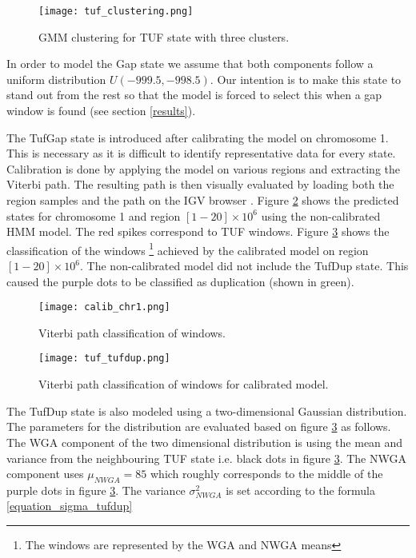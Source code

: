 \documentclass[12pt]{article}
\begin{document}
\begin{figure}[!htb]
	\begin{center}
		\texttt{[image: tuf\_clustering.png]}
	\end{center}
	\caption{GMM clustering for TUF state with three clusters.}
	\label{tuf_clustering}
\end{figure}

In order to model the Gap state we assume that both components follow a uniform distribution $U(-999.5, -998.5)$. Our intention is to make this state to stand out from the rest so that the model is forced to  select this when a gap window is found (see section \ref{results}).
 
The TufGap state is introduced after calibrating the model on chromosome 1.   
This is necessary as it is difficult to identify representative data for every state. Calibration is done by applying  the model on various regions and extracting the Viterbi path. The resulting path is then visually evaluated by loading both the region samples and the path on the IGV browser \cite{2011Robinson}.  Figure \ref{calib_chr1} shows the predicted states for chromosome 1 and region $[1-20]\times 10^6$ using the non-calibrated HMM model. The red spikes correspond to TUF windows. Figure \ref{tuf_tufdup} shows the classification of the windows \footnote{The windows are represented by the WGA and NWGA means} achieved by the calibrated model on region $[1-20]\times 10^6$. The non-calibrated model did not include the TufDup state. This caused the purple dots to be classified as duplication (shown in green). 

\begin{figure}[!htb]
	\begin{center}
		\texttt{[image: calib\_chr1.png]}
	\end{center}
	\caption{Viterbi path classification of windows.}
	\label{calib_chr1}
\end{figure}

\begin{figure}[!htb]
	\begin{center}
		\texttt{[image: tuf\_tufdup.png]}
	\end{center}
	\caption{Viterbi path classification of windows for calibrated model.}
	\label{tuf_tufdup}
\end{figure}

The TufDup state is also modeled using a two-dimensional Gaussian distribution. The parameters for the distribution are evaluated based on  figure \ref{tuf_tufdup} as follows.
The WGA component of the two dimensional distribution is using the mean and variance from the
neighbouring TUF state i.e. black dots in figure \ref{tuf_tufdup}. The NWGA component uses $\mu_{NWGA}=85$ which roughly corresponds to the middle of the purple dots in figure \ref{tuf_tufdup}. The variance $\sigma_{NWGA}^2$ is set according to the formula \ref{equation_sigma_tufdup}
\end{document}
